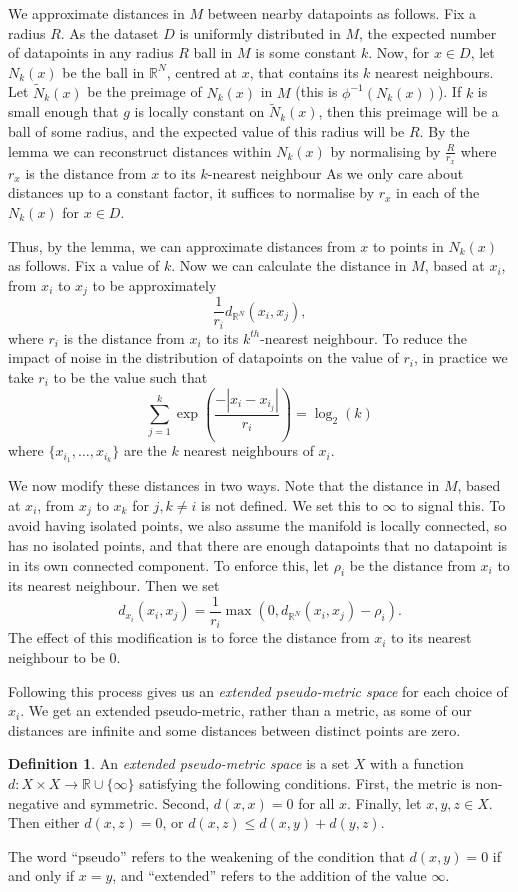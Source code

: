 \documentclass[a4paper,11pt,leqno]{article} \usepackage{amsmath}
\newcommand{\RR}{\mathbb{R}} \newcommand{\QQ}{\mathbb{Q}}
\theoremstyle{definition}
\newtheorem{defn}{Definition}
\begin{document}
We approximate distances in $M$ between nearby datapoints as follows.
Fix a radius $R$.
As the dataset $D$ is uniformly distributed in $M$, the expected number of
datapoints in any radius $R$ ball in $M$ is some constant $k$.
Now, for $x\in D$, let $N_k(x)$ be the ball in $\RR^N$, centred at $x$, that
contains its $k$ nearest neighbours.
Let $\tilde{N}_k(x)$ be the preimage of $N_k(x)$ in $M$ (this is $\phi^{-1}(N_k(x))$).
If $k$ is small enough that $g$ is locally constant on $\tilde{N}_k(x)$, then
this preimage will be a ball of some radius, and the expected value of this
radius will be $R$.
By the lemma we can reconstruct
distances within $N_k(x)$ by normalising by $\frac{R}{r_x}$ where $r_x$ is the
distance from $x$ to its $k$-nearest neighbour
As we only care about distances up to a constant factor, it suffices to
normalise by $r_x$ in each of the $N_k(x)$ for $x\in D$.

Thus, by the lemma, we can approximate distances from $x$ to points in $N_k(x)$
as follows.
Fix a value of $k$.
Now we can calculate the distance in $M$, based at $x_i$, from $x_i$ to $x_j$
to be approximately
$$\frac{1}{r_i}d_{\RR^N}(x_i, x_j),$$
where $r_i$ is the distance from $x_i$ to its $k^{th}$-nearest neighbour.
To reduce the impact of noise in the distribution of datapoints on the value of
$r_i$, in practice we take $r_i$ to be the value such that
$$\sum_{j=1}^k\exp\left(\frac{-|x_i-x_{i_j}|}{r_i}\right) = \log_2(k)$$
where $\{x_{i_1},\ldots,x_{i_k}\}$ are the $k$ nearest neighbours of $x_i$.

We now modify these distances in two ways.
Note that the distance in $M$, based at $x_i$, from $x_j$ to $x_k$ for
$j,k\not= i$ is not defined.
We set this to $\infty$ to signal this.
To avoid having isolated points, we also assume the manifold is locally
connected, so has no isolated points, and that there are enough datapoints that
no datapoint is in its own connected component.
To enforce this, let $\rho_i$ be the distance from $x_i$ to its nearest
neighbour.
Then we set
$$d_{x_i}(x_i, x_j)=\frac{1}{r_i}\max(0, d_{\RR^N}(x_i,
x_j)-\rho_i).$$
The effect of this modification is to force the distance from $x_i$ to its
nearest neighbour to be 0.

Following this process gives us an \emph{extended pseudo-metric space} for each
choice of $x_i$.
We get an extended pseudo-metric, rather than a metric, as some of our
distances are infinite and some distances between distinct points are zero.
\begin{defn}
  An \emph{extended pseudo-metric space} is a set $X$ with a function $d:
  X\times X\to \RR \cup \{\infty\}$ satisfying the following conditions.
  First, the metric is non-negative and symmetric.
  Second, $d(x, x) = 0$ for all $x$.
  Finally, let $x,y,z\in X$.
  Then either $d(x,z) = 0$, or $d(x,z)\leq d(x,y)+d(y,z)$.
\end{defn}
The word ``pseudo'' refers to the weakening of the condition that $d(x,y) = 0$
if and only if $x = y$, and ``extended'' refers to the addition of the value
$\infty$.
\end{document}
